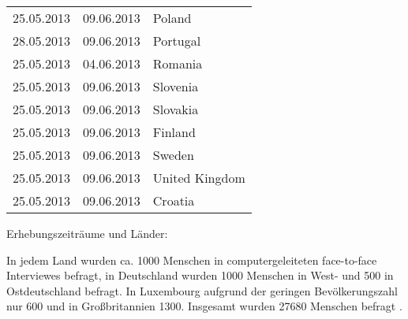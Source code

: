 \begin{floatingtable}[r]
{\begin{tabular}{l | l | l}
			25.05.2013 & 09.06.2013 & Poland \\
			28.05.2013 & 09.06.2013 & Portugal \\
			25.05.2013 & 04.06.2013 & Romania \\
			25.05.2013 & 09.06.2013 & Slovenia \\
			25.05.2013 & 09.06.2013 & Slovakia \\
			25.05.2013 & 09.06.2013 & Finland \\
			25.05.2013 & 09.06.2013 & Sweden \\
			25.05.2013 & 09.06.2013 & United Kingdom \\
			25.05.2013 & 09.06.2013 & Croatia \\
		\end{tabular}}
	\caption{Erhebungszeiträume und Länder: \cite{eb794}}
\end{floatingtable}

In jedem Land wurden ca. 1000 Menschen in computergeleiteten face-to-face Interviewes befragt, in Deutschland wurden 1000 Menschen in West- und 500 in Ostdeutschland befragt. In Luxembourg aufgrund der geringen Bevölkerungszahl nur 600 und in Großbritannien 1300. Insgesamt wurden 27680 Menschen befragt \parencite{eceuropaeu}.

